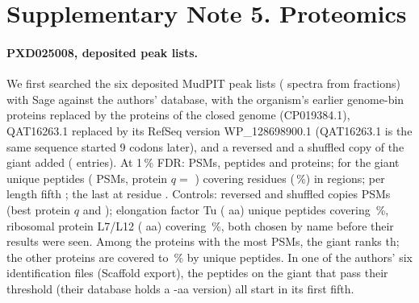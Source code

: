\documentclass[11pt]{article}
\begin{document}
\begin{table}[ht]
\centering\scriptsize
\caption{RNA-seq of the testable repeat-flag models. Unique junctions: introns whose junction sequence occurs once in the
model (computed before the run). Supported: introns with $\geq$ 3 exact uniquely placed reads. Testable: both flanking exons
at unique depth $\geq$ 10 in one run (unsupported among them after the slash).}\label{tab:reprna}
\end{table}

\FloatBarrier
\section*{Supplementary Note 5. Proteomics}

\paragraph{PXD025008, deposited peak lists.} We first searched the six deposited MudPIT peak lists (
spectra from  fractions) with Sage against the authors' database, with the organism's earlier genome-bin
proteins replaced by the  proteins of the closed genome (CP019384.1), QAT16263.1 replaced by
its RefSeq version WP\_128698900.1 (QAT16263.1 is the same sequence started 9 codons later), and a reversed and a shuffled
copy of the giant added ( entries). At 1\,\% FDR:  PSMs,  peptides and
 proteins; for the giant  unique peptides ( PSMs, protein
$q = $ ) covering  residues (\,\%) in
 regions; per length fifth ; the last at residue .
Controls: reversed and shuffled copies  PSMs (best protein $q$  and );
elongation factor Tu ( aa)  unique peptides covering \,\%,
ribosomal protein L7/L12 ( aa)  covering \,\%, both chosen by name
before their results were seen. Among the   proteins with the most PSMs, the giant ranks
th; the other proteins are covered to \,\% by unique peptides. In one of
the authors' six identification files (Scaffold export), the  peptides on the giant that
pass their threshold (their database holds a -aa version) all start in its first fifth.
\end{document}
